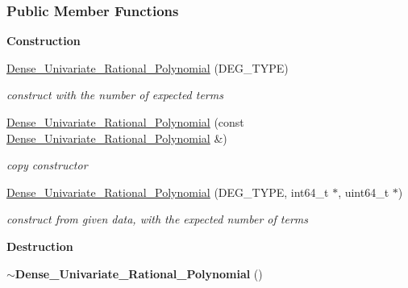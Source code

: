 \subsubsection*{Public Member Functions}
\begin{Indent}\textbf{ Construction}\par
\begin{DoxyCompactItemize}
\item 
\mbox{\label{group__polygroup_a373bccc0cf3c06160702a484edb5ca10}} 
\hyperlink{group__polygroup_a373bccc0cf3c06160702a484edb5ca10}{Dense\+\_\+\+Univariate\+\_\+\+Rational\+\_\+\+Polynomial} (D\+E\+G\+\_\+\+T\+Y\+PE)
\begin{DoxyCompactList}\small\item\em construct with the number of expected terms \end{DoxyCompactList}\item 
\mbox{\label{group__polygroup_a809d897a0cc6a226c42b80617c2aeab5}} 
\hyperlink{group__polygroup_a809d897a0cc6a226c42b80617c2aeab5}{Dense\+\_\+\+Univariate\+\_\+\+Rational\+\_\+\+Polynomial} (const \hyperlink{group__polygroup_class_dense___univariate___rational___polynomial}{Dense\+\_\+\+Univariate\+\_\+\+Rational\+\_\+\+Polynomial} \&)
\begin{DoxyCompactList}\small\item\em copy constructor \end{DoxyCompactList}\item 
\mbox{\label{group__polygroup_a355c74bb36083fa2407a28ac066ca081}} 
\hyperlink{group__polygroup_a355c74bb36083fa2407a28ac066ca081}{Dense\+\_\+\+Univariate\+\_\+\+Rational\+\_\+\+Polynomial} (D\+E\+G\+\_\+\+T\+Y\+PE, int64\+\_\+t $\ast$, uint64\+\_\+t $\ast$)
\begin{DoxyCompactList}\small\item\em construct from given data, with the expected number of terms \end{DoxyCompactList}\end{DoxyCompactItemize}
\end{Indent}
\begin{Indent}\textbf{ Destruction}\par
\begin{DoxyCompactItemize}
\item 
\mbox{\label{group__polygroup_aeade1e7c67dd64b79340aff7555e0354}} 
{\bfseries $\sim$\+Dense\+\_\+\+Univariate\+\_\+\+Rational\+\_\+\+Polynomial} ()
\end{DoxyCompactItemize}
\end{Indent}
